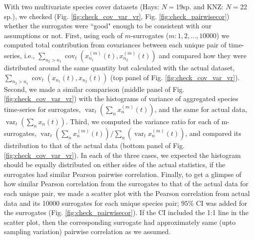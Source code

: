 \documentclass[letterpaper,11pt]{article}
\newcommand{\var}{\operatorname{var}}
\newcommand{\cov}{\operatorname{cov}}
\begin{document}



With two multivariate species cover datasets (Hays: $N=$19sp. and KNZ: $N=$22 sp.), we checked 
(Fig. \ref{fig:check_cov_var_vr}, Fig. \ref{fig:check_pairwisecor}) whether the 
surrogates were ``good" enough to be consistent with our assumptions or not. First, using 
each of $m$-surrogates (${m : 1, 2, \ldots, 10000}$) we computed total contribution from
covariances between each unique pair of time-series, i.e., $\sum_{n_2>n_1} \cov_t(x_{n_1}^{(m)}(t),x_{n_2}^{(m)}(t))$ 
and compared how they were distributed around the same quantity but calculated with the 
actual dataset, $\sum_{n_2>n_1} \cov_t(x_{n_1}(t),x_{n_2}(t))$ (top panel 
of Fig. \ref{fig:check_cov_var_vr}). Second, we made a similar 
comparison (middle panel of Fig. \ref{fig:check_cov_var_vr}) with the histograms 
of variance of aggregated species time-series 
for surrogates, $\var_t(\sum_n x_n^{(m)}(t))$, and the same for 
actual data, $\var_t(\sum_n x_n(t))$. Third, we computed the variance ratio
for each of m-surrogates, $\var_t(\sum_n x_n^{(m)}(t))/ \sum_n(\var_t x_n^{(m)}(t))$,
and compared its distribution to that of the actual data (bottom panel 
of Fig. \ref{fig:check_cov_var_vr}). In each of the three cases, we expected 
the histogram should be equally distributed on either sides of the actual statistics, if 
the surrogates had similar Pearson pairwise correlation. Finally, to get a glimpse of how 
similar Pearson correlation from the surrogates to that of the actual data for each unique pair, 
we made a scatter plot with the Pearson correlation from actual data and its 10000 surrogates 
for each unique species pair; $95\%$ CI was added for the surrogates 
(Fig. \ref{fig:check_pairwisecor}). If the CI included the 1:1 line in the scatter plot,
then the corresponding surrogate had approximately same (upto sampling variation) pairwise correlation as we assumed.
\end{document}
